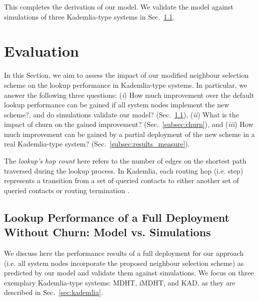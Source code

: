 \documentclass[10pt, conference, compsocconf, letterpaper]{IEEEtran}
\begin{document}
This completes the derivation of our model. We validate the model against simulations of three Kademlia-type systems in Sec.~\ref{subsec:results_model_sim}.




\section{Evaluation} \label{sec:results}

In this Section, we aim to assess the impact of our modified neighbour selection scheme on the lookup performance in Kademlia-type systems. In particular, we answer the following three questions: (\emph{i}) How much improvement over the default lookup performance can be gained if all system nodes implement the new scheme?, and do simulations validate our model? (Sec.~\ref{subsec:results_model_sim}), (\emph{ii}) What is the impact of churn on the gained  improvement? (Sec.~\ref{subsec:churn}), and (\emph{iii}) How much improvement can be gained by a partial deployment of the new scheme in a real Kademlia-type system? (Sec.~\ref{subsec:results_measure}). 

The \emph{lookup's hop count} here refers to the number of edges on the shortest path traversed during the lookup process. In Kademlia, each routing hop (i.e. step) represents a transition from a set of queried contacts to either another set of queried contacts or routing termination \cite{roos13comprehending}.




















\subsection{Lookup Performance of a Full Deployment Without Churn: Model vs. Simulations}
\label{subsec:results_model_sim}

We discuss here the performance results of a full deployment for our approach (i.e. all system nodes incorporate the proposed neighbour selection scheme) as predicted by our model and validate them against simulations. We focus on three exemplary Kademlia-type systems: MDHT, iMDHT, and KAD, as they are described in Sec.~\ref{sec:kademlia}.
\end{document}
